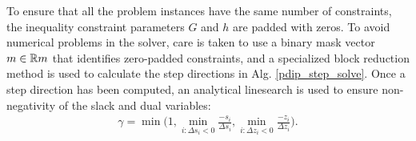 To ensure that all the problem instances have the same number of constraints, the inequality constraint parameters $G$ and $h$ are padded with zeros. To avoid numerical problems in the solver, care is taken to use a binary mask vector $m \in \mathbb{R}{m}$ that identifies zero-padded constraints, and a specialized block reduction method is used to calculate the step directions in Alg. \ref{pdip_step_solve}.  Once a step direction has been computed, an analytical linesearch is used to ensure non-negativity of the slack and dual variables:
%
\begin{align}
    \gamma = \operatorname{min} \big( 1, \min_{i:\Delta s_i < 0} \frac{-s_i}{\Delta s_i}, \min_{i:\Delta z_i < 0} \frac{-z_i}{\Delta z_i} \big). \label{eq:linesearch}
\end{align}
%
%
%
%
